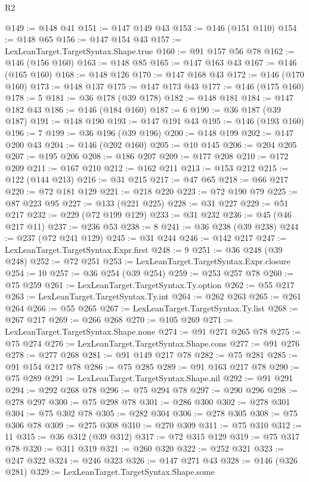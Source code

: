 \begin{lexlean}{R2}
\begin{coremodule}
{{{{{{{{{{{{{{{{{{{{{{{{{{{{{{{{{{{{{{{{{{{@149 := @148 @41
@151 := @147 @149 @43
@153 := @146 (@151 @110)
@154 := @148 @65
@156 := @147 @154 @43
@157 := LexLeanTarget.TargetSyntax.Shape.true
@160 := @91 @157 @56 @78
@162 := @146 (@156 @160)
@163 := @148 @85
@165 := @147 @163 @43
@167 := @146 (@165 @160)
@168 := @148 @126
@170 := @147 @168 @43
@172 := @146 (@170 @160)
@173 := @148 @137
@175 := @147 @173 @43
@177 := @146 (@175 @160)
@178 := 5
@181 := @36 @178 (@39 @178)
@182 := @148 @181
@184 := @147 @182 @43
@186 := @146 (@184 @160)
@187 := 6
@190 := @36 @187 (@39 @187)
@191 := @148 @190
@193 := @147 @191 @43
@195 := @146 (@193 @160)
@196 := 7
@199 := @36 @196 (@39 @196)
@200 := @148 @199
@202 := @147 @200 @43
@204 := @146 (@202 @160)
@205 := @10 @145
@206 := @204 @205
@207 := @195 @206
@208 := @186 @207
@209 := @177 @208
@210 := @172 @209
@211 := @167 @210
@212 := @162 @211
@213 := @153 @212
@215 := @122 (@144 @213)
@216 := @31 @215
@217 := @47 @65
@218 := @66 @217
@220 := @72 @181 @129
@221 := @218 @220
@223 := @72 @190 @79
@225 := @87 @223 @95
@227 := @133 (@221 @225)
@228 := @31 @227
@229 := @51 @217
@232 := @229 (@72 @199 @129)
@233 := @31 @232
@236 := @45 (@46 @217 @11)
@237 := @236 @53
@238 := 8
@241 := @36 @238 (@39 @238)
@244 := @237 (@72 @241 @129)
@245 := @31 @244
@246 := @142 @217
@247 := LexLeanTarget.TargetSyntax.Expr.first
@248 := 9
@251 := @36 @248 (@39 @248)
@252 := @72 @251
@253 := LexLeanTarget.TargetSyntax.Expr.closure
@254 := 10
@257 := @36 @254 (@39 @254)
@259 := @253 @257 @78
@260 := @75 @259
@261 := LexLeanTarget.TargetSyntax.Ty.option
@262 := @55 @217
@263 := LexLeanTarget.TargetSyntax.Ty.int
@264 := @262 @263
@265 := @261 @264
@266 := @55 @265
@267 := LexLeanTarget.TargetSyntax.Ty.list
@268 := @267 @217
@269 := @266 @268
@270 := @105 @269
@271 := LexLeanTarget.TargetSyntax.Shape.none
@274 := @91 @271 @265 @78
@275 := @75 @274
@276 := LexLeanTarget.TargetSyntax.Shape.cons
@277 := @91 @276
@278 := @277 @268
@281 := @91 @149 @217 @78
@282 := @75 @281
@285 := @91 @154 @217 @78
@286 := @75 @285
@289 := @91 @163 @217 @78
@290 := @75 @289
@291 := LexLeanTarget.TargetSyntax.Shape.nil
@292 := @91 @291
@294 := @292 @268 @78
@296 := @75 @294 @78
@297 := @290 @296
@298 := @278 @297
@300 := @75 @298 @78
@301 := @286 @300
@302 := @278 @301
@304 := @75 @302 @78
@305 := @282 @304
@306 := @278 @305
@308 := @75 @306 @78
@309 := @275 @308
@310 := @270 @309
@311 := @75 @310
@312 := 11
@315 := @36 @312 (@39 @312)
@317 := @72 @315 @129
@319 := @75 @317 @78
@320 := @311 @319
@321 := @260 @320
@322 := @252 @321
@323 := @247 @322
@324 := @246 @323
@326 := @147 @271 @43
@328 := @146 (@326 @281)
@329 := LexLeanTarget.TargetSyntax.Shape.some
}}}}}}}}}}}}}}}}}}}}}}}}}}}}}}}}}}}}}}}}}}}
\end{coremodule}
\end{lexlean}
